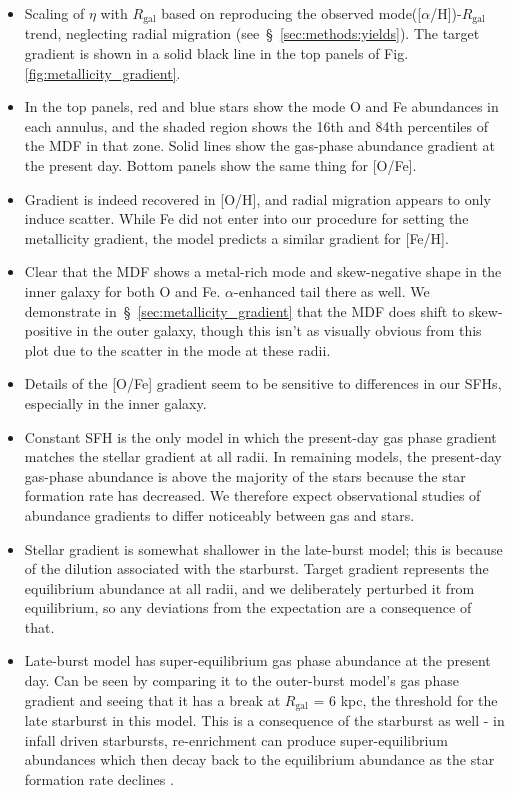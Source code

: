 \documentclass[fleqn, usenatbib]{mnras}
\begin{document}
\begin{itemize} 
	\item Scaling of $\eta$ with $R_\text{gal}$ based on reproducing the 
	observed mode([$\alpha$/H])-$R_\text{gal}$ trend, neglecting radial 
	migration (see~\S~\ref{sec:methods:yields}). The target gradient is 
	shown in a solid black line in the top panels of Fig. 
	\ref{fig:metallicity_gradient}. 

	\item In the top panels, red and blue stars show the mode O and Fe 
	abundances in each annulus, and the shaded region shows the 16th and 
	84th percentiles of the MDF in that zone. Solid lines show the gas-phase 
	abundance gradient at the present day. Bottom panels show the same thing 
	for [O/Fe]. 

	\item Gradient is indeed recovered in [O/H], and radial migration appears 
	to only induce scatter. While Fe did not enter into our procedure for 
	setting the metallicity gradient, the model predicts a similar gradient 
	for [Fe/H]. 

	\item Clear that the MDF shows a metal-rich mode and skew-negative shape 
	in the inner galaxy for both O and Fe. $\alpha$-enhanced tail there as 
	well. We demonstrate in~\S~\ref{sec:metallicity_gradient} that the MDF 
	does shift to skew-positive in the outer galaxy, though this isn't as 
	visually obvious from this plot due to the scatter in the mode at these 
	radii. 

	\item Details of the [O/Fe] gradient seem to be sensitive to differences 
	in our SFHs, especially in the inner galaxy. 

	\item Constant SFH is the only model in which the present-day gas phase 
	gradient matches the stellar gradient at all radii. In remaining models, 
	the present-day gas-phase abundance is above the majority of the stars 
	because the star formation rate has decreased. We therefore expect 
	observational studies of abundance gradients to differ noticeably between 
	gas and stars. 

	\item Stellar gradient is somewhat shallower in the late-burst model; this 
	is because of the dilution associated with the starburst. Target gradient 
	represents the equilibrium abundance at all radii, and we deliberately 
	perturbed it from equilibrium, so any deviations from the expectation are 
	a consequence of that. 

	\item Late-burst model has super-equilibrium gas phase abundance at the 
	present day. Can be seen by comparing it to the outer-burst model's 
	gas phase gradient and seeing that it has a break at $R_\text{gal}$ = 6 
	kpc, the threshold for the late starburst in this model. This is a 
	consequence of the starburst as well - in infall driven starbursts, 
	re-enrichment can produce super-equilibrium abundances which then decay 
	back to the equilibrium abundance as the star formation rate declines 
	\citep{Johnson2020}. 
\end{itemize} 
\end{document}
